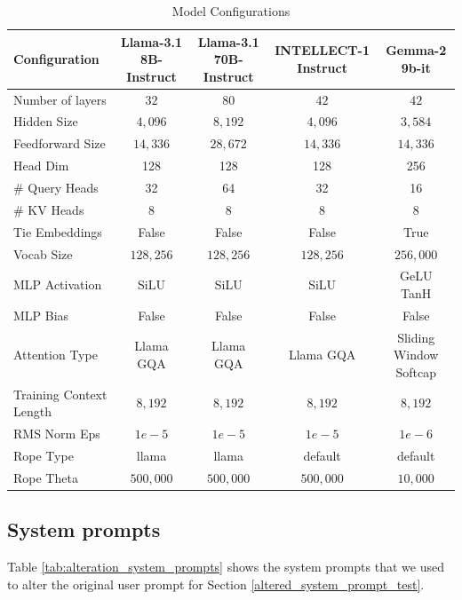 \documentclass{article}
\theoremstyle{plain}
\theoremstyle{definition}
\theoremstyle{remark}
\begin{document}
\begin{table}[ht]
\caption{Model Configurations}
\label{tab:model_config}
\vskip 0.15in
\begin{center}
\begin{small}
\begin{tabular}{lcccc}
\toprule
Configuration &  Llama-3.1 8B-Instruct & Llama-3.1 70B-Instruct & INTELLECT-1 Instruct & Gemma-2 9b-it\\
\midrule
Number of layers & $32$ & $80$ & $42$ & $42$ \\
Hidden Size & $4,096$ & $8,192$ & $4,096$ & $3,584$ \\
Feedforward Size & $14,336$ & $28,672$ & $14,336$ & $14,336$ \\
Head Dim & 128 & 128 & 128 & 256 \\
\# Query Heads & 32 & 64 & 32 & 16 \\
\# KV Heads & 8 & 8 & 8 & 8 \\
Tie Embeddings & False & False & False & True \\
Vocab Size & $128,256$ & $128,256$ & $128,256$ & $256,000$ \\
MLP Activation & SiLU & SiLU & SiLU & GeLU TanH \\
MLP Bias & False & False & False & False \\
Attention Type & Llama GQA & Llama GQA & Llama GQA & Sliding Window Softcap \\
Training Context Length & $8,192$ & $8,192$ & $8,192$ & $8,192$ \\
RMS Norm Eps &$1e-5$ &$1e-5$ &$1e-5$ & $1e-6$ \\
Rope Type & llama & llama & default & default \\
Rope Theta & $500,000$ & $500,000$ & $500,000$ & $10,000$ \\
\bottomrule
\end{tabular}
\end{small}
\end{center}
\vskip -0.1in
\end{table}

\subsection{System prompts}
\label{system_prompts}

Table \ref{tab:alteration_system_prompts} shows the system prompts that we used to alter the original user prompt for Section \ref{altered_system_prompt_test}.
\end{document}
